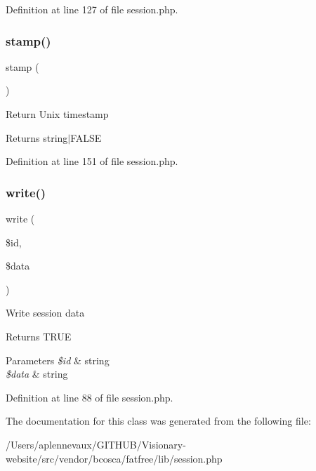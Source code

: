 Definition at line 127 of file session.\+php.

\hypertarget{class_session_ab0b8b94527259f4aacdf1fd45411abfe}{}\label{class_session_ab0b8b94527259f4aacdf1fd45411abfe} 
\subsubsection{\texorpdfstring{stamp()}{stamp()}}
{\footnotesize\ttfamily stamp (\begin{DoxyParamCaption}{ }\end{DoxyParamCaption})}

Return Unix timestamp \begin{DoxyReturn}{Returns}
string$\vert$\+F\+A\+L\+SE 
\end{DoxyReturn}


Definition at line 151 of file session.\+php.

\hypertarget{class_session_a5f277b5f0e4e2154cddc9a3a0d2bf57d}{}\label{class_session_a5f277b5f0e4e2154cddc9a3a0d2bf57d} 
\subsubsection{\texorpdfstring{write()}{write()}}
{\footnotesize\ttfamily write (\begin{DoxyParamCaption}\item[{}]{\$id,  }\item[{}]{\$data }\end{DoxyParamCaption})}

Write session data \begin{DoxyReturn}{Returns}
T\+R\+UE 
\end{DoxyReturn}

\begin{DoxyParams}{Parameters}
{\em \$id} & string \\
\hline
{\em \$data} & string \\
\hline
\end{DoxyParams}


Definition at line 88 of file session.\+php.



The documentation for this class was generated from the following file\+:\begin{DoxyCompactItemize}
\item 
/\+Users/aplennevaux/\+G\+I\+T\+H\+U\+B/\+Visionary-\/website/src/vendor/bcosca/fatfree/lib/session.\+php\end{DoxyCompactItemize}
